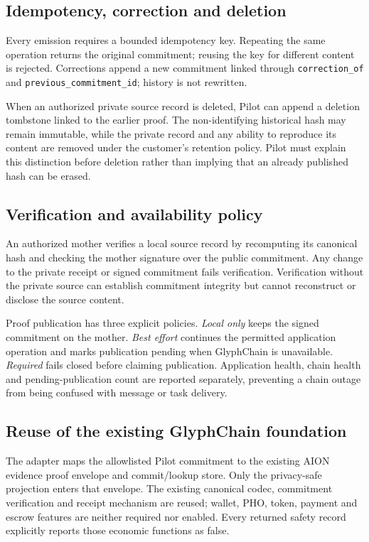 \subsection{Idempotency, correction and deletion}

Every emission requires a bounded idempotency key.  Repeating the same operation
returns the original commitment; reusing the key for different content is rejected.
Corrections append a new commitment linked through \texttt{correction\_of} and
\texttt{previous\_commitment\_id}; history is not rewritten.

When an authorized private source record is deleted, Pilot can append a deletion
tombstone linked to the earlier proof.  The non-identifying historical hash may
remain immutable, while the private record and any ability to reproduce its content
are removed under the customer's retention policy.  Pilot must explain this
distinction before deletion rather than implying that an already published hash can
be erased.

\subsection{Verification and availability policy}

An authorized mother verifies a local source record by recomputing its canonical
hash and checking the mother signature over the public commitment.  Any change to
the private receipt or signed commitment fails verification.  Verification without
the private source can establish commitment integrity but cannot reconstruct or
disclose the source content.

Proof publication has three explicit policies.  \emph{Local only} keeps the signed
commitment on the mother.  \emph{Best effort} continues the permitted application
operation and marks publication pending when GlyphChain is unavailable.
\emph{Required} fails closed before claiming publication.  Application health,
chain health and pending-publication count are reported separately, preventing a
chain outage from being confused with message or task delivery.

\subsection{Reuse of the existing GlyphChain foundation}

The adapter maps the allowlisted Pilot commitment to the existing AION evidence
proof envelope and commit/lookup store.  Only the privacy-safe projection enters
that envelope.  The existing canonical codec, commitment verification and receipt
mechanism are reused; wallet, PHO, token, payment and escrow features are neither
required nor enabled.  Every returned safety record explicitly reports those
economic functions as false.

